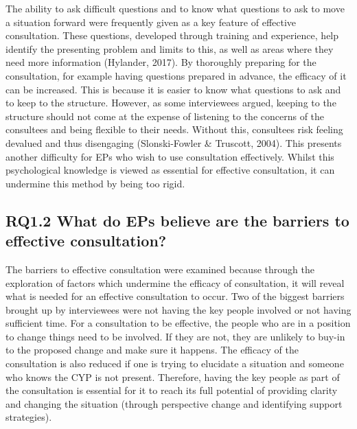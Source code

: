 \documentclass[
  english,
  man,floatsintext]{apa6}
\begin{document}
The ability to ask difficult questions and to know what questions to ask
to move a situation forward were frequently given as a key feature of
effective consultation. These questions, developed through training and
experience, help identify the presenting problem and limits to this, as
well as areas where they need more information
(Hylander, 2017). By thoroughly
preparing for the consultation, for example having questions prepared in
advance, the efficacy of it can be increased. This is because it is
easier to know what questions to ask and to keep to the structure.
However, as some interviewees argued, keeping to the structure should
not come at the expense of listening to the concerns of the consultees
and being flexible to their needs. Without this, consultees risk feeling
devalued and thus disengaging
(Slonski-Fowler \& Truscott, 2004). This presents another
difficulty for EPs who wish to use consultation effectively. Whilst this
psychological knowledge is viewed as essential for effective
consultation, it can undermine this method by being too rigid.

\hypertarget{rq1.2-what-do-eps-believe-are-the-barriers-to-effective-consultation}{%
\subsection{RQ1.2 What do EPs believe are the barriers to effective consultation?}\label{rq1.2-what-do-eps-believe-are-the-barriers-to-effective-consultation}}

The barriers to effective consultation were examined because through the
exploration of factors which undermine the efficacy of consultation, it
will reveal what is needed for an effective consultation to occur. Two
of the biggest barriers brought up by interviewees were not having the
key people involved or not having sufficient time. For a consultation to
be effective, the people who are in a position to change things need to
be involved. If they are not, they are unlikely to buy-in to the
proposed change and make sure it happens. The efficacy of the
consultation is also reduced if one is trying to elucidate a situation
and someone who knows the CYP is not present. Therefore, having the key
people as part of the consultation is essential for it to reach its full
potential of providing clarity and changing the situation (through
perspective change and identifying support strategies).
\end{document}
